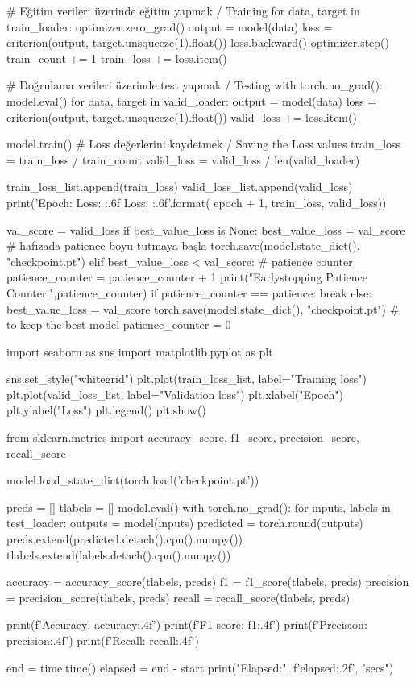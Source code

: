 \documentclass[11pt]{article}
\begin{document}
\begin{python}
    # Eğitim verileri üzerinde eğitim yapmak / Training
    for data, target in train_loader:
        optimizer.zero_grad()
        output = model(data)
        loss = criterion(output, target.unsqueeze(1).float())
        loss.backward()
        optimizer.step()
        train_count += 1
        train_loss += loss.item()

    # Doğrulama verileri üzerinde test yapmak / Testing
    with torch.no_grad():
        model.eval()
        for data, target in valid_loader:
            output = model(data)
            loss = criterion(output, target.unsqueeze(1).float())
            valid_loss += loss.item()
    
    model.train()
    # Loss değerlerini kaydetmek / Saving the Loss values
    train_loss = train_loss / train_count
    valid_loss = valid_loss / len(valid_loader)
        
    train_loss_list.append(train_loss)
    valid_loss_list.append(valid_loss)
    print('Epoch: {} \tTraining Loss: {:.6f} \tValidation Loss: {:.6f}'.format(
        epoch + 1, train_loss, valid_loss))
    
    val_score = valid_loss
    if best_value_loss is None:
        best_value_loss = val_score # hafızada patience boyu tutmaya başla
        torch.save(model.state_dict(), "checkpoint.pt")
    elif best_value_loss < val_score: # patience counter
        patience_counter = patience_counter + 1
        print("Earlystopping Patience Counter:",patience_counter)
        if patience_counter == patience:
            break
    else:
        best_value_loss = val_score
        torch.save(model.state_dict(), "checkpoint.pt") # to keep the best model
        patience_counter = 0

import seaborn as sns
import matplotlib.pyplot as plt

sns.set_style("whitegrid")
plt.plot(train_loss_list, label="Training loss")
plt.plot(valid_loss_list, label="Validation loss")
plt.xlabel("Epoch")
plt.ylabel("Loss")
plt.legend()
plt.show()

from sklearn.metrics import accuracy_score, f1_score, precision_score, recall_score

model.load_state_dict(torch.load('checkpoint.pt'))

preds = []
tlabels = []
model.eval()
with torch.no_grad():
    for inputs, labels in test_loader:
        outputs = model(inputs)
        predicted = torch.round(outputs)
        preds.extend(predicted.detach().cpu().numpy())
        tlabels.extend(labels.detach().cpu().numpy())

accuracy = accuracy_score(tlabels, preds)
f1 = f1_score(tlabels, preds)
precision = precision_score(tlabels, preds)
recall = recall_score(tlabels, preds)

print(f'Accuracy: {accuracy:.4f}')
print(f'F1 score: {f1:.4f}')
print(f'Precision: {precision:.4f}')
print(f'Recall: {recall:.4f}')

end = time.time()
elapsed = end - start
print("Elapsed:", f'{elapsed:.2f}', "secs")
\end{python}
\end{document}

